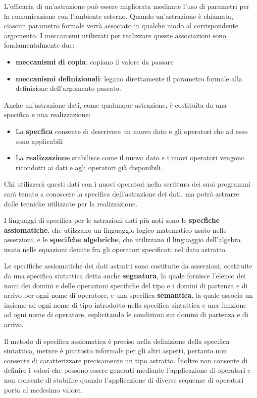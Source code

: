 \documentclass[a4paper,18pt]{extarticle}
\begin{document}
L'efficacia di un'astrazione può essere migliorata mediante l'uso di parametri per la comunicazione con l'ambiente esterno. Quando un'astrazione è chiamata, ciascun parametro formale verrà associato in qualche modo al corrispondente argomento. I meccanismi utilizzati per realizzare queste associazioni sono fondamentalmente due:
\begin{itemize}
  \item \textbf{meccanismi di copia}: copiano il valore da passare
  \item \textbf{meccanismi definizionali}: legano direttamente il parametro formale alla definizione dell'argomento passato.
\end{itemize}

Anche un'astrazione dati, come qualunque astrazione, è costituita da una specifica e una realizzazione:
\begin{itemize}
  \item La \textbf{specfica} consente di descrivere un nuovo dato e gli operatori che ad esso sono applicabili
  \item La \textbf{realizzazione} stabilisce come il nuovo dato e i nuovi operatori vengono ricondotti ai dati e agli operatori già disponibili.
\end{itemize}
 Chi utilizzerà questi dati con i nuovi operatori nella scrittura dei suoi programmi sarà tenuto a conoscere la specifica dell'astrazione dei dati, ma potrà astrarre dalle tecniche utilizzate per la realizzazione.
 
 I linguaggi di specifica per le astrazioni dati più noti sono le \textbf{specfiche assiomatiche}, che utilzzano un linguaggio logico-matematico usato nelle asserzioni, e le \textbf{specifche algebriche}, che utilizzano il linguaggio dell'algebra usato nelle equazioni deinite fra gli operatori specificati nel dato astratto.
 
 Le specifiche assiomatiche dei dati astratti sono costituite da asserzioni, costituite da una specifica sintattica detta anche \textbf{segnatura}, la quale fornisce l'elenco dei nomi dei domini  e delle operazioni specifiche del tipo e i domini di partenza e di arrivo per ogni nome di operatore, e una specifica \textbf{semantica}, la quale associa un insieme ad ogni nome di tipo introdotto nella specifica sintattica e una funzione ad ogni nome di operatore, esplicitando le condizioni sui domini di partenza e di arrivo.
 
 Il metodo di specifica assiomatica è preciso nella definizione della specifica sintattica, metnre è piuttosto informale per gli altri aspetti, pertanto non consente di caratterizzare precisamente un tipo astratto. Inoltre non consente di definire i valori che possono essere generati mediante l'applicazione di operatori e non consente di stabilire quando l'applicazione di diverse sequenze di operatori porta al medesimo valore.
 
\end{document}
